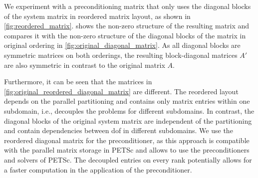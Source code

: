 % 

We experiment with a preconditioning matrix that only uses the diagonal blocks of the system matrix in reordered matrix layout, as shown in \cref{fig:reordered_matrix}. 
 shows the non-zero structure of the resulting matrix and compares it with the non-zero structure of the diagonal blocks of the matrix in original ordering in \cref{fig:original_diagonal_matrix}. 
As all diagonal blocks are symmetric matrices on both orderings, the resulting block-diagonal matrices $A'$ are also symmetric in contrast to the original matrix $A$.

Furthermore, it can be seen that the matrices in \cref{fig:original_reordered_diagonal_matrix} are different. The reordered layout depends on the parallel partitioning and contains only matrix entries within one subdomain, i.e., decouples the problems for different subdomains. In contrast, the diagonal blocks of the original system matrix are independent of the partitioning and contain dependencies between dof in different subdomains.
We use the reordered diagonal matrix for the preconditioner, as this approach is compatible with the parallel matrix storage in PETSc and allows to use the preconditioners and solvers of PETSc.
The decoupled entries on every rank potentially allows for a faster computation in the application of the preconditioner.

